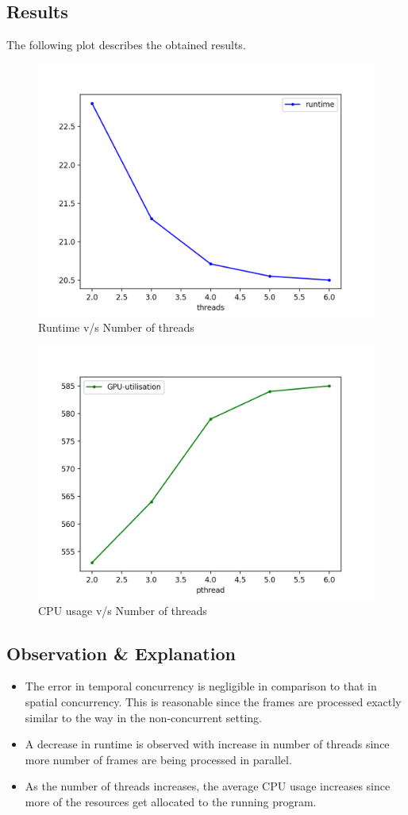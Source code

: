 \documentclass[a4paper]{article}
\begin{document}
\subsection*{Results}
The following plot describes the obtained results.
\begin{figure}[H]
    \centering
    \includegraphics[width=0.5\linewidth]{temporal-threads-runtime.png}
    \caption{Runtime v/s Number of threads}
    \label{fig:spatial-threads-runtime.png}
\end{figure}
\begin{figure}[H]
    \centering
    \includegraphics[width=0.5\linewidth]{temporal-thread-GPU-utilisation.png}
    \caption{CPU usage v/s Number of threads}
    \label{fig:temporal-thread-GPU-utilisation.pn}
\end{figure}
\subsection*{Observation \& Explanation}
\begin{itemize}
    \item The error in temporal concurrency is negligible in comparison to that in spatial concurrency. This is reasonable since the frames are processed exactly similar to the way in the non-concurrent setting. 
    \item A decrease in runtime is observed with increase in number of threads since more number of frames are being processed in parallel.
    \item As the number of threads increases, the average CPU usage increases since more of the resources get allocated to the running program.
\end{itemize}
\end{document}
